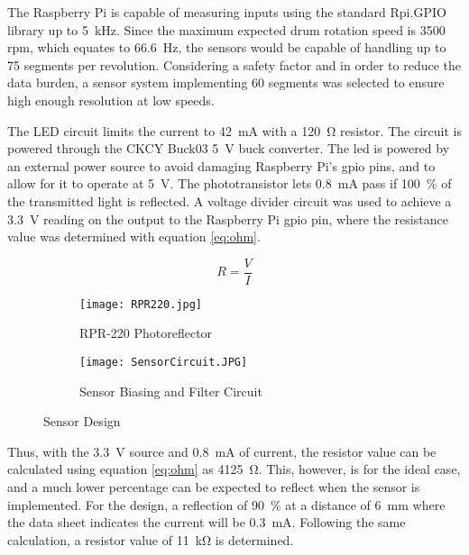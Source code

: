 The Raspberry Pi is capable of measuring inputs using the standard Rpi.GPIO library up to \SI{5}{\kilo\hertz}. Since the maximum expected drum rotation speed is 3500 \acs{rpm}, which equates to \SI{66.6}{\hertz}, the sensors would be capable of handling up to 75 segments per revolution. Considering a safety factor and in order to reduce the data burden, a sensor system implementing 60 segments was selected to ensure high enough resolution at low speeds.

The LED circuit limits the current to \SI{42}{\milli\ampere} with a \SI{120}{\ohm} resistor. The circuit is powered through the CKCY Buck03 \SI{5}{\volt} buck converter. The \acs{led} is powered by an external power source to avoid damaging Raspberry Pi's \acs{gpio} pins, and to allow for it to operate at \SI{5}{\volt}. The phototransistor lets \SI{0.8}{\milli\ampere} pass if \SI{100}{\percent} of the transmitted light is reflected. A voltage divider circuit was used to achieve a \SI{3.3}{\volt} reading on the output to the Raspberry Pi \ac{gpio} pin, where the resistance value was determined with equation \ref{eq:ohm}. 

\begin{equation}
	R = \frac{V}{I}
	\label{eq:ohm}
\end{equation}

\begin{figure}[H]
	\centering
	\begin{subfigure}[t]{.315\textwidth}
		\centering
		\texttt{[image: RPR220.jpg]}
		\caption{RPR-220 Photoreflector}
		\citep{RPR:2015}
		\label{fig:rpr}
	\end{subfigure}
	\begin{subfigure}[t]{.65\textwidth}
		\centering
		\texttt{[image: SensorCircuit.JPG]}
		\caption{Sensor Biasing and Filter Circuit}
		\label{fig:sensorD}
	\end{subfigure}
	\caption{Sensor Design}
	\label{fig:Sensor}
\end{figure}

Thus, with the \SI{3.3}{\volt} source and \SI{0.8}{\milli\ampere} of current, the resistor value can be calculated using equation \ref{eq:ohm} as \SI{4125}{\ohm}. This, however, is for the ideal case, and a much lower percentage can be expected to reflect when the sensor is implemented. For the design, a reflection of \SI{90}{\percent} at a distance of \SI{6}{\milli\meter} where the data sheet indicates the current will be \SI{0.3}{\milli\ampere}. Following the same calculation, a resistor value of \SI{11}{\kilo\ohm} is determined.


